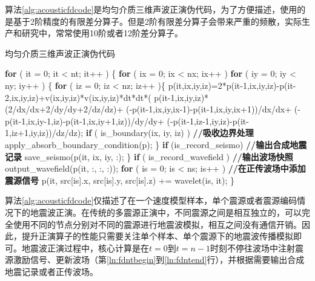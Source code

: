 算法\ref{alg:acousticfdcode}是均匀介质三维声波正演伪代码，为了方便描述，使用的是基于2阶精度的有限差分算子\cite{fu2011eliminating}。但是2阶有限差分算子会带来严重的频散，实际生产和研究中，常常使用10阶或者12阶差分算子。

\begin{algorithm}[ht]
\small
\caption{均匀介质三维声波正演伪代码}\label{alg:acousticfdcode}
\begin{algorithmic}[1]
\State \textbf{for} ( it = 0; it < nt; it++ ) \{ \label{ln:fdntbegin}
\State \quad\quad \textbf{for} ( ix = 0; ix < nx; ix++ )
\State \quad\quad\quad\quad \textbf{for} ( iy = 0; iy < ny; iy++ ) \{
\State \quad\quad\quad\quad\quad\quad \textbf{for} ( iz = 0; iz < nz; iz++ )\{
\State \quad\quad\quad\quad\quad\quad\quad\quad  p(it,ix,iy,iz)=2*p(it-1,ix,iy,iz)-p(it-2,ix,iy,iz)+v(ix,iy,iz)*v(ix,iy,iz)*dt*dt*(
\State \quad\quad\quad\quad\quad\quad\quad\quad\quad\quad\quad\quad\quad\quad\quad                                    p(it-1,ix,iy,iz)*(2/dx/dx+2/dy/dy+2/dz/dz)+
\State \quad\quad\quad\quad\quad\quad\quad\quad\quad\quad\quad\quad\quad\quad\quad                                    (-p(it-1,ix,iy,ix-1)-p(it-1,ix,iy,ix+1))/dx/dx+
\State \quad\quad \quad\quad\quad\quad\quad\quad\quad\quad\quad\quad\quad\quad\quad                                    (-p(it-1,ix,iy-1,iz)-p(it-1,ix,iy+1,iz))/dy/dy+
\State \quad\quad\quad\quad\quad\quad\quad\quad\quad\quad\quad\quad\quad\quad\quad                                    (-p(it-1,iz-1,iy,iz)-p(it-1,iz+1,iy,iz))/dz/dz);
\State
\State \quad\quad\quad\quad\quad\quad\quad\quad \textbf{if} ( is\_boundary(ix, iy, iz) ) \textbf{//吸收边界处理} \label{ln:fdboundary}
\State \quad\quad\quad\quad\quad\quad\quad\quad\quad\quad\quad    apply\_absorb\_boundary\_condition(p);
\State \quad\quad\quad\quad\quad\quad                \} \label{ln:fdntend}
\State \quad\quad\quad\quad\quad\quad \textbf{if} (is\_record\_seismo) \textbf{//输出合成地震记录}
\State \quad\quad\quad\quad\quad\quad\quad\quad save\_seismo(p(it, ix, iy, :);
\State \quad\quad\quad\quad \}
\State
\State \quad\quad \textbf{if} ( is\_record\_wavefield ) \textbf{//输出波场快照}
\State \quad\quad\quad\quad output\_wavefield(p(it, :, :, :));
\State
\State \quad\quad \textbf{for} ( is = 0; is < ns; is++ ) \textbf{//在正传波场中添加震源信号}
\State \quad\quad\quad\quad p(it, src[is].x, src[is].y, src[is].z) += wavelet(is, it);
\State \}
\end{algorithmic}
\end{algorithm}

算法\ref{alg:acousticfdcode}仅描述了在一个速度模型样本，单个震源或者震源编码情况下的地震波正演。在传统的多震源正演中，不同震源之间是相互独立的，可以完全使用不同的节点分别对不同的震源进行地震波模拟，相互之间没有通信开销。因此，提升正演算子的性能只需要关注单个样本、单个震源下的地震波传播模拟即可。地震波正演过程中，核心计算是在$t=0$到$t=n-1$时刻不停往波场中注射震源激励信号、更新波场（第\ref{ln:fdntbegin}到\ref{ln:fdntend}行），并根据需要输出合成地震记录或者正传波场。

